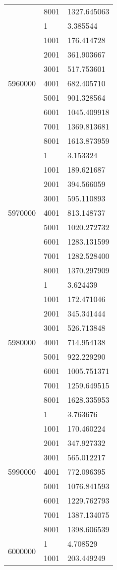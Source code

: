\begin{table}[htb!]
\begin{tabular}{lll}
 & 8001 & 1327.645063 \\
\multirow[c]{9}{*}{5960000} & 1 & 3.385544 \\
 & 1001 & 176.414728 \\
 & 2001 & 361.903667 \\
 & 3001 & 517.753601 \\
 & 4001 & 682.405710 \\
 & 5001 & 901.328564 \\
 & 6001 & 1045.409918 \\
 & 7001 & 1369.813681 \\
 & 8001 & 1613.873959 \\
\multirow[c]{9}{*}{5970000} & 1 & 3.153324 \\
 & 1001 & 189.621687 \\
 & 2001 & 394.566059 \\
 & 3001 & 595.110893 \\
 & 4001 & 813.148737 \\
 & 5001 & 1020.272732 \\
 & 6001 & 1283.131599 \\
 & 7001 & 1282.528400 \\
 & 8001 & 1370.297909 \\
\multirow[c]{9}{*}{5980000} & 1 & 3.624439 \\
 & 1001 & 172.471046 \\
 & 2001 & 345.341444 \\
 & 3001 & 526.713848 \\
 & 4001 & 714.954138 \\
 & 5001 & 922.229290 \\
 & 6001 & 1005.751371 \\
 & 7001 & 1259.649515 \\
 & 8001 & 1628.335953 \\
\multirow[c]{9}{*}{5990000} & 1 & 3.763676 \\
 & 1001 & 170.460224 \\
 & 2001 & 347.927332 \\
 & 3001 & 565.012217 \\
 & 4001 & 772.096395 \\
 & 5001 & 1076.841593 \\
 & 6001 & 1229.762793 \\
 & 7001 & 1387.134075 \\
 & 8001 & 1398.606539 \\
\multirow[c]{9}{*}{6000000} & 1 & 4.708529 \\
 & 1001 & 203.449249 \\

\end{tabular}
\end{table}
